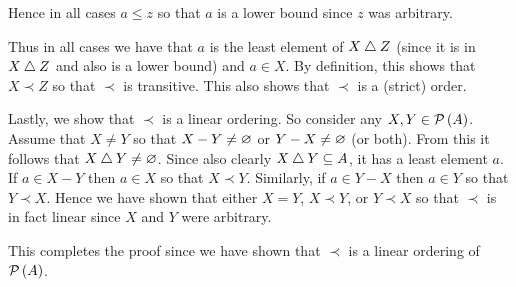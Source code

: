 {{\begin{enumerate}
            Hence in all cases $a \leq z$ so that $a$ is a lower bound since $z$ was arbitrary.
    \end{enumerate}

    Thus in all cases we have that $a$ is the least element of $X \bigtriangleup Z$ (since it is in $X \bigtriangleup Z$ and also is a lower bound) and $a \in X$.
    By definition, this shows that $X \prec Z$ so that $\prec$ is transitive.
    This also shows that $\prec$ is a (strict) order.

    Lastly, we show that $\prec$ is a linear ordering.
    So consider any $X, Y \in \mathcal{P}\left(A\right)$.
    Assume that $X \neq Y$ so that $X - Y \neq \varnothing$ or $Y - X \neq \varnothing$ (or both).
    From this it follows that $X \bigtriangleup Y \neq \varnothing$.
    Since also clearly $X \bigtriangleup Y \subseteq A$, it has a least element $a$.
    If $a \in X - Y$ then $a \in X$ so that $X \prec Y$.
    Similarly, if $a \in Y - X$ then $a \in Y$ so that $Y \prec X$.
    Hence we have shown that either $X = Y$, $X \prec Y$, or $Y \prec X$ so that $\prec$ is in fact linear since $X$ and $Y$ were arbitrary.

    This completes the proof since we have shown that $\prec$ is a linear ordering of $\mathcal{P}\left(A\right)$.
  }
}

